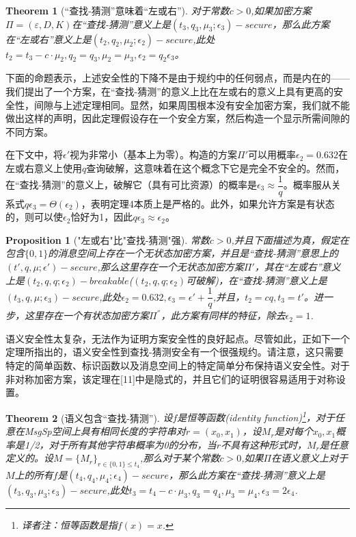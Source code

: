 \documentclass[]{article}
\newtheorem{theorem}{Theorem}
\newtheorem{proposition}{Proposition}
\begin{document}
\begin{theorem}[“查找-猜测”意味着“左或右”]
	对于常数$c>0$,如果加密方案$\Pi=(\varepsilon,D,K)$在“查找-猜测”意义上是$(t_3,q_3,\mu_3;\epsilon_3)-secure$，那么此方案在“左或右”意义上是$(t_2,q_2,\mu_2;\epsilon_2)-secure$,此处$t_2=t_3-c\cdot \mu_2,q_2=q_3,\mu_2=\mu_3,\epsilon_2=q_2 \epsilon_3$。
\end{theorem}

下面的命题表示，上述安全性的下降不是由于规约中的任何弱点，而是内在的——我们提出了一个方案，在“查找-猜测”的意义上比在左或右的意义上具有更高的安全性，间隙与上述定理相同。显然，如果周围根本没有安全加密方案，我们就不能做出这样的声明，因此定理假设存在一个安全方案，然后构造一个显示所需间隙的不同方案。

在下文中，将$\epsilon'$视为非常小（基本上为零）。构造的方案$\Pi'$可以用概率$\epsilon_2=0.632$在左或右意义上使用$q$查询破解，这意味着在这个概念下它是完全不安全的。然而，在“查找-猜测”的意义上，破解它（具有可比资源）的概率是$\epsilon_3\approx \dfrac{1}{q}$。概率服从关系式$q\epsilon_3 = \Theta(\epsilon_2)$，表明定理4本质上是严格的。此外，如果允许方案是有状态的，则可以使$\epsilon_2$恰好为1，因此$q\epsilon_3 \approx \epsilon_2$。

\begin{proposition}["左或右"比"查找-猜测"强]
	常数$c>0$,并且下面描述为真，假定在包含$\{0,1\}$的消息空间上存在一个无状态加密方案，并且是“查找-猜测”意思上的$(t',q,\mu;\epsilon')-secure$,那么这里存在一个无状态加密方案$\Pi'$，其在“左或右”意义上是$(t_2,q,q;\epsilon_2)-breakable$($(t_2,q,q;\epsilon_2)$可破解)，在“查找-猜测”意义上是$(t_3,q,\mu;\epsilon_3)-secure$,此处$\epsilon_2=0.632,\epsilon_3=\epsilon'+\dfrac{1}{q}$,并且，$t_2=cq,t_3=t'$。进一步，这里存在一个有状态加密方案$\Pi^{''}$，此方案有同样的特征，除去$\epsilon_2=1$.
\end{proposition}

语义安全性太复杂，无法作为证明方案安全性的良好起点。尽管如此，正如下一个定理所指出的，语义安全性到查找-猜测安全有一个很强规约。请注意，这只需要特定的简单函数、标识函数以及消息空间上的特定简单分布保持语义安全性。对于非对称加密方案，该定理在[11]中是隐式的，并且它们的证明很容易适用于对称设置。

\begin{theorem}[语义包含“查找-猜测”]
	设$f$是恒等函数(identity function)\footnote{译者注：恒等函数是指$f(x)=x$.}，对于任意在MsgSp空间上具有相同长度的字符串对$r=(x_0,x_1)$，设$M_r$是对每个$x_0,x_1$概率是1/2，对于所有其他字符串概率为0的分布，当$r$不具有这种形式时，$M_r$是任意定义的。设$M=\{M_r\}_{r\in \{0,1\}\leq t_4}$,那么对于某个常数$c>0$,如果$\Pi$在语义意义上对于$M$上的所有$f$是$(t_4,q_4,\mu_4;\epsilon_4)-secure$，那么此方案在“查找-猜测”意义上是$(t_3,q_3,\mu_3;\epsilon_3)-secure$,此处$t_3=t_4-c\cdot \mu_3,q_3=q_4,\mu_3=\mu_4,\epsilon_3=2\epsilon_4$.
\end{theorem}
\end{document}
